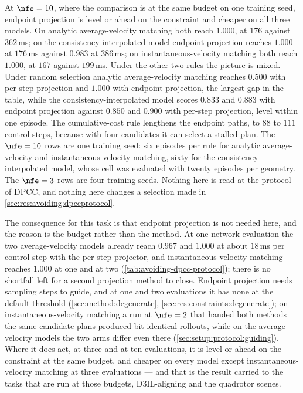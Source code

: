 At $\nfe=10$, where the comparison is at the same budget on one training seed, endpoint projection is level
or ahead on the constraint and cheaper on all three models. On analytic average-velocity matching both reach
$1.000$, at $176$ against $362$\,ms; on the consistency-interpolated model endpoint projection reaches
$1.000$ at $176$\,ms against $0.983$ at $386$\,ms; on instantaneous-velocity matching both reach $1.000$, at
$167$ against $199$\,ms. Under the other two rules the picture is mixed. Under random selection analytic
average-velocity matching reaches $0.500$ with per-step projection and $1.000$ with endpoint projection, the
largest gap in the table, while the consistency-interpolated model scores $0.833$ and $0.883$ with endpoint
projection against $0.850$ and $0.900$ with per-step projection, level within one episode. The
cumulative-cost rule lengthens the endpoint paths, to $88$ to $111$ control steps, because with four
candidates it can select a stalled plan. The $\nfe=10$ rows are one training seed: six episodes per
rule for analytic average-velocity and instantaneous-velocity matching, sixty for the consistency-interpolated
model, whose cell was evaluated with twenty episodes per geometry. The $\nfe=3$ rows are four training
seeds. Nothing here is read at the protocol of \ac{DPCC}, and nothing here changes a selection made in
\autoref{sec:res:avoiding:dpccprotocol}.

The consequence for this task is that endpoint projection is not needed here, and the reason is the budget
rather than the method. At one network evaluation the two average-velocity models already reach $0.967$
and $1.000$ at about $18$\,ms per control step with the per-step projector, and instantaneous-velocity
matching reaches $1.000$ at one and at two (\autoref{tab:avoiding-dpcc-protocol}); there is no shortfall
left for a second projection method to close. Endpoint projection needs sampling steps to guide, and at
one and two evaluations it has none at the default threshold (\autoref{sec:method:degenerate},
\autoref{sec:res:constraints:degenerate}); on instantaneous-velocity matching a run at $\nfe=2$ that handed
both methods the same candidate plans produced bit-identical rollouts, while on the average-velocity models
the two arms differ even there (\autoref{sec:setup:protocol:guiding}). Where it does act, at three and at ten
evaluations, it is level or ahead on the constraint at the same budget, and cheaper on every model except
instantaneous-velocity matching at three evaluations --- and that is the result carried to the tasks that are
run at those budgets, D3IL-aligning and the quadrotor scenes.

